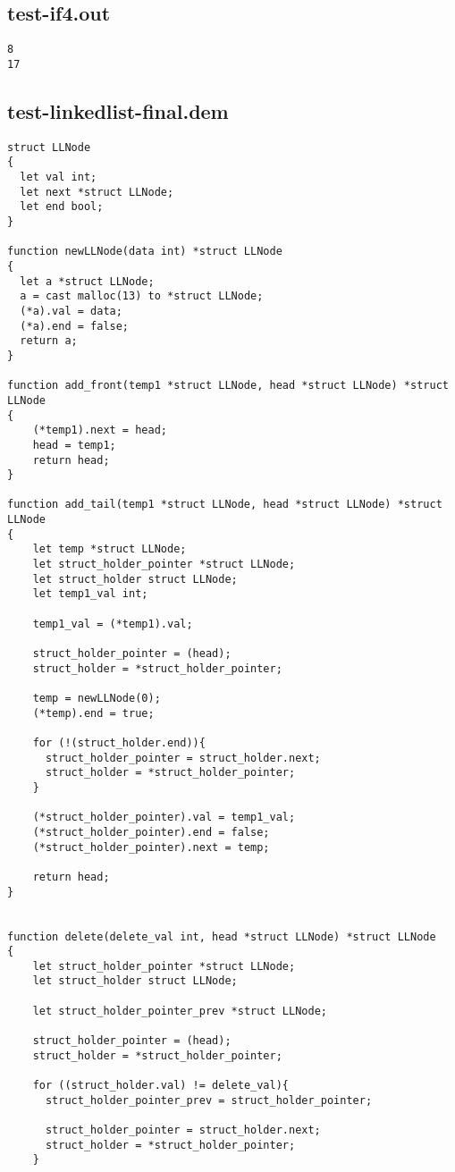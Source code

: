 \subsection{test-if4.out}
\begin{lstlisting}
8
17
\end{lstlisting}
\subsection{test-linkedlist-final.dem}
\begin{lstlisting}
struct LLNode
{
  let val int;
  let next *struct LLNode;
  let end bool;
}

function newLLNode(data int) *struct LLNode
{
  let a *struct LLNode;
  a = cast malloc(13) to *struct LLNode;
  (*a).val = data;
  (*a).end = false;
  return a;
}

function add_front(temp1 *struct LLNode, head *struct LLNode) *struct LLNode
{
    (*temp1).next = head;
    head = temp1;
    return head;
}

function add_tail(temp1 *struct LLNode, head *struct LLNode) *struct LLNode
{
    let temp *struct LLNode;
    let struct_holder_pointer *struct LLNode;
    let struct_holder struct LLNode;  
    let temp1_val int;

    temp1_val = (*temp1).val;
 
    struct_holder_pointer = (head);
    struct_holder = *struct_holder_pointer;   

    temp = newLLNode(0);
    (*temp).end = true;

    for (!(struct_holder.end)){
      struct_holder_pointer = struct_holder.next;
      struct_holder = *struct_holder_pointer;
    }

    (*struct_holder_pointer).val = temp1_val;
    (*struct_holder_pointer).end = false;
    (*struct_holder_pointer).next = temp;
    
    return head;
}


function delete(delete_val int, head *struct LLNode) *struct LLNode
{
    let struct_holder_pointer *struct LLNode;
    let struct_holder struct LLNode;
   
    let struct_holder_pointer_prev *struct LLNode;
 
    struct_holder_pointer = (head);
    struct_holder = *struct_holder_pointer;   

    for ((struct_holder.val) != delete_val){
      struct_holder_pointer_prev = struct_holder_pointer;
  
      struct_holder_pointer = struct_holder.next;
      struct_holder = *struct_holder_pointer;
    }


\end{lstlisting}
